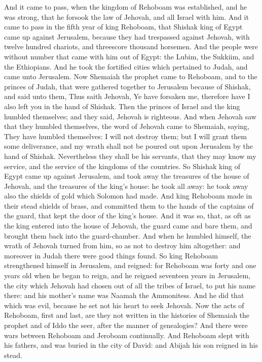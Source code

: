 And it came to pass, when the kingdom of Rehoboam was established, and he was strong, that he forsook the law of Jehovah, and all Israel with him. And it came to pass in the fifth year of king Rehoboam, that Shishak king of Egypt came up against Jerusalem, because they had trespassed against Jehovah, with twelve hundred chariots, and threescore thousand horsemen. And the people were without number that came with him out of Egypt: the Lubim, the Sukkiim, and the Ethiopians. And he took the fortified cities which pertained to Judah, and came unto Jerusalem. Now Shemaiah the prophet came to Rehoboam, and to the princes of Judah, that were gathered together to Jerusalem because of Shishak, and said unto them, Thus saith Jehovah, Ye have forsaken me, therefore have I also left you in the hand of Shishak. Then the princes of Israel and the king humbled themselves; and they said, Jehovah is righteous. And when Jehovah saw that they humbled themselves, the word of Jehovah came to Shemaiah, saying, They have humbled themselves: I will not destroy them; but I will grant them some deliverance, and my wrath shall not be poured out upon Jerusalem by the hand of Shishak. Nevertheless they shall be his servants, that they may know my service, and the service of the kingdoms of the countries.  So Shishak king of Egypt came up against Jerusalem, and took away the treasures of the house of Jehovah, and the treasures of the king’s house: he took all away: he took away also the shields of gold which Solomon had made. And king Rehoboam made in their stead shields of brass, and committed them to the hands of the captains of the guard, that kept the door of the king’s house. And it was so, that, as oft as the king entered into the house of Jehovah, the guard came and bare them, and brought them back into the guard-chamber. And when he humbled himself, the wrath of Jehovah turned from him, so as not to destroy him altogether: and moreover in Judah there were good things found.  So king Rehoboam strengthened himself in Jerusalem, and reigned: for Rehoboam was forty and one years old when he began to reign, and he reigned seventeen years in Jerusalem, the city which Jehovah had chosen out of all the tribes of Israel, to put his name there: and his mother’s name was Naamah the Ammonitess. And he did that which was evil, because he set not his heart to seek Jehovah.  Now the acts of Rehoboam, first and last, are they not written in the histories of Shemaiah the prophet and of Iddo the seer, after the manner of genealogies? And there were wars between Rehoboam and Jeroboam continually. And Rehoboam slept with his fathers, and was buried in the city of David: and Abijah his son reigned in his stead. 

